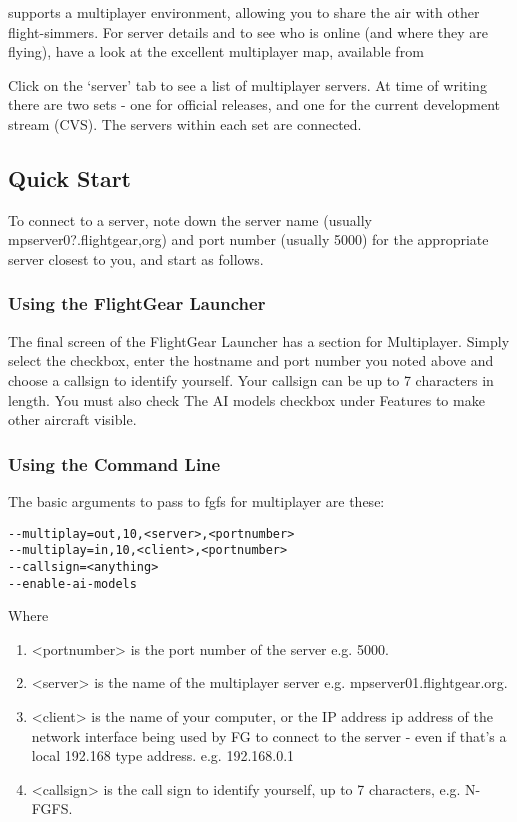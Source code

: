 \FlightGear{} supports a multiplayer environment, allowing you to share the air with other flight-simmers. 
For server details and to see who is online (and where they are flying), have a look at the excellent multiplayer map, available from

\noindent
{}

Click on the `server' tab to see a list of multiplayer servers. At time of writing there are two sets - one for official \FlightGear{} releases,
and one for the current development stream (CVS). The servers within each set are connected. 
\subsection{Quick Start}

To connect to a server, note down the server name (usually mpserver0?.flightgear,org) and port number (usually 5000) for the appropriate 
server
closest to you, and start \FlightGear{} as follows.

\subsubsection{Using the FlightGear Launcher}

The final screen of the FlightGear Launcher has a section for Multiplayer. 
Simply select the checkbox, enter the hostname and port 
number you noted above and choose a callsign to identify yourself. 
Your callsign can be up to 7 characters in length. 
You must also check The AI models checkbox under Features to make other aircraft visible.

\subsubsection{Using the Command Line}

The basic arguments to pass to fgfs for multiplayer are these:

\begin{verbatim}
--multiplay=out,10,<server>,<portnumber>
--multiplay=in,10,<client>,<portnumber>
--callsign=<anything>
--enable-ai-models
\end{verbatim}

Where 
\begin{enumerate}
\item <portnumber> is the port number of the server e.g. 5000.
\item <server> is the name of the multiplayer server e.g. mpserver01.flightgear.org.
\item <client> is the name of your computer, or the IP address ip address of the network interface being used by FG to connect to the server -
even if that's a local 192.168 type address. e.g. 192.168.0.1
\item <callsign> is the call sign to identify yourself, up to 7 characters, e.g. N-FGFS.
\end{enumerate}

